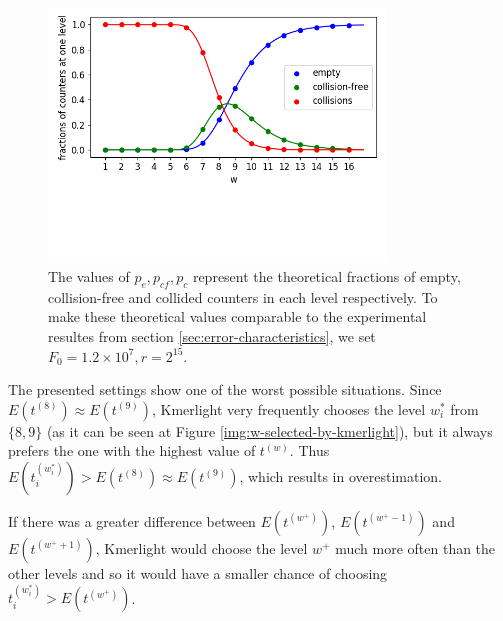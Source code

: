 \begin{figure}[h]
\centerline{\includegraphics[width=0.8\textwidth, trim={0cm, 3.5cm, 0cm, 0cm}, clip]{images/pcf.png}}
\caption[Plot of $p_e, p_{cf}, p_c$ across the levels]{The values of $p_e, p_{cf}, p_c$ 
represent the theoretical fractions of empty, collision-free and collided counters in
each level respectively. To make these theoretical values comparable to the experimental
resultes from section \ref{sec:error-characteristics}, we set $F_0 = 1.2 \times 10^7, r = 2^{15}$.} 
\label{img:pe-pcf-pc}
\end{figure}

The presented settings show one of the worst possible situations. Since
$E(t^{(8)}) \approx E(t^{(9)})$, Kmerlight very frequently chooses the level $w_i^*$ from 
$\{8, 9\}$ (as it can be seen at Figure \ref{img:w-selected-by-kmerlight}), 
but it always prefers the one with the highest value of $t^{(w)}$.
Thus $E(t_i^{(w^*_i)}) > E(t^{(8)}) \approx E(t^{(9)})$, which results in overestimation.

If there was a greater difference between $E(t^{(w^+)})$, $E(t^{(w^+-1)})$ and
$E(t^{(w^++1)})$, Kmerlight would choose the level $w^+$ much more often than the other
levels and so it would have a smaller chance of choosing $t_i^{(w^*_i)} > E(t^{(w^+)})$.
